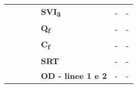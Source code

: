 \begin{table}[H]
\begin{center}
\begin{tabular}{lccllcc}
		\multicolumn{1}{c}{\textbf{}}            & \multicolumn{1}{l}{}                                                                          & \multicolumn{1}{l}{}                                                                            & \multicolumn{1}{l|}{} & \multicolumn{1}{l|}{\textbf{SVI\textsubscript{3}}}             & \multicolumn{1}{c|}{-}                                                                       & \multicolumn{1}{c|}{-}                                                                          \\ \cline{5-7} 
		\textbf{}                                &                                                                                               & \multicolumn{1}{l}{}                                                                            & \multicolumn{1}{l|}{} & \multicolumn{1}{l|}{\textbf{Q\textsubscript{f}}}               & \multicolumn{1}{c|}{-}                                                                       & \multicolumn{1}{c|}{-}                                                                          \\ \cline{5-7} 
		\textbf{}                                &                                                                                               & \multicolumn{1}{l}{}                                                                            & \multicolumn{1}{l|}{} & \multicolumn{1}{l|}{\textbf{C\textsubscript{f}}}               & \multicolumn{1}{c|}{-}                                                                       & \multicolumn{1}{c|}{-}                                                                          \\ \cline{5-7} 
		\textbf{}                                &                                                                                               & \multicolumn{1}{l}{}                                                                            & \multicolumn{1}{l|}{} & \multicolumn{1}{l|}{\textbf{SRT}}              & \multicolumn{1}{c|}{-}                                                                       & \multicolumn{1}{c|}{-}                                                                          \\ \cline{5-7} 
		\textbf{}                                &                                                                                               & \multicolumn{1}{l}{}                                                                            & \multicolumn{1}{l|}{} & \multicolumn{1}{l|}{\textbf{OD - linee 1 e 2}} & \multicolumn{1}{c|}{-}                                                                       & \multicolumn{1}{c|}{-}                                                                          \\ \cline{5-7} 

\end{tabular}
\end{center}
\end{table}
